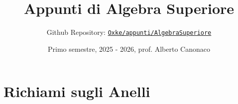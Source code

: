 

\title{Appunti di Algebra Superiore}
\author{Github Repository:
\href{https://github.com/Oxke/appunti/tree/main/AlgebraSuperiore}{\texttt{Oxke/appunti/AlgebraSuperiore}}}

\date{Primo semestre, 2025 \-- 2026, prof. Alberto Canonaco}


\maketitle



\section{Richiami sugli Anelli}



